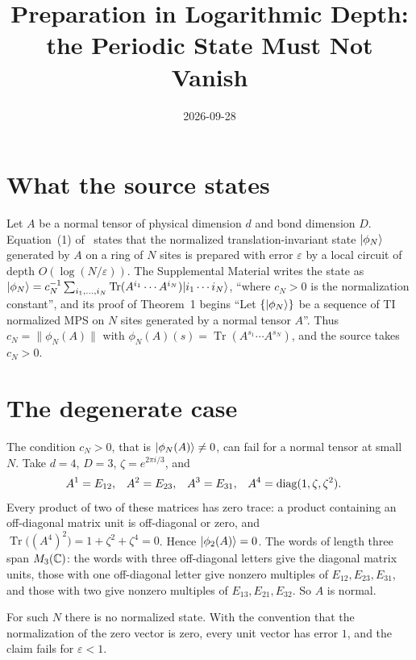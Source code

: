 \documentclass{article}
\title{Preparation in Logarithmic Depth: the Periodic State Must Not Vanish}
\author{}
\date{2026-09-28}
\begin{document}
\maketitle
{}

\section{What the source states}
Let $A$ be a normal tensor of physical dimension $d$ and bond dimension $D$.
Equation~(1) of~\cite{Malz2024Preparation} states that the normalized
translation-invariant state $|\phi_N\rangle$ generated by $A$ on a ring of $N$
sites is prepared with error $\varepsilon$ by a local circuit of depth
$O(\log(N/\varepsilon))$. The Supplemental Material writes the state as
$|\phi_N\rangle=c_N^{-1}\sum_{i_1,\dots,i_N}\operatorname{Tr}(A^{i_1}\cdots A^{i_N})
|i_1\cdots i_N\rangle$, ``where $c_N>0$ is the normalization constant'', and its
proof of Theorem~1 begins ``Let $\{|\phi_N\rangle\}$ be a sequence of TI
normalized MPS on $N$ sites generated by a normal tensor $A$''. Thus
$c_N=\lVert\phi_N(A)\rVert$ with
$\phi_N(A)(s)=\operatorname{Tr}(A^{s_1}\cdots A^{s_N})$, and the source takes
$c_N>0$.

\section{The degenerate case}
The condition $c_N>0$, that is $|\phi_N(A)\rangle\neq0$, can fail for a normal
tensor at small $N$. Take $d=4$, $D=3$, $\zeta=e^{2\pi i/3}$, and
\begin{align}
    A^1 & =E_{12}, & A^2 & =E_{23}, & A^3 & =E_{31},
        & A^4 & =\operatorname{diag}(1,\zeta,\zeta^2).
    \notag
\end{align}
Every product of two of these matrices has zero trace: a product containing an
off-diagonal matrix unit is off-diagonal or zero, and
$\operatorname{Tr}\bigl((A^4)^2\bigr)=1+\zeta^2+\zeta^4=0$. Hence $|\phi_2(A)\rangle=0$. The words of length
three span $M_3(\mathbb{C})$: the words with three off-diagonal letters give the
diagonal matrix units, those with one off-diagonal letter give nonzero
multiples of $E_{12},E_{23},E_{31}$, and those with two give nonzero multiples
of $E_{13},E_{21},E_{32}$. So $A$ is normal.

For such $N$ there is no normalized state. With the convention that the
normalization of the zero vector is zero, every unit vector has error $1$, and
the claim fails for $\varepsilon<1$.
\end{document}
